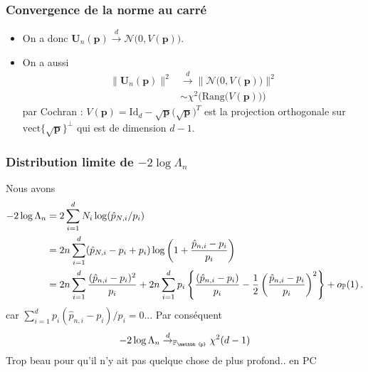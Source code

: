 \begin{frame}
\frametitle{Convergence de la norme au carré}
\begin{itemize}
\item On a donc ${\boldsymbol U}_n(\boldsymbol{p}) \stackrel{d}{\longrightarrow} {\mathcal N}\big(0,V(\boldsymbol{p})\big)$.
\item On a aussi
\begin{align*}
\|{\boldsymbol U}_n(\boldsymbol{p}) \|^2 & \stackrel{d}{\longrightarrow} \| {\mathcal N}\big(0,V(\boldsymbol{p})\big)\|^2 \\
& \sim \chi^2\big(\mathrm{Rang}\big(V(\boldsymbol{p})\big)\big)
\end{align*}
par \alert{Cochran} :  $V(\boldsymbol{p}) = \mathrm{Id}_d-\sqrt{\boldsymbol{p}}\big(\sqrt{\boldsymbol{p}}\big)^T$ est la projection orthogonale sur $\mathrm{vect}\{\sqrt{\boldsymbol{p}}\}^\perp$ qui est de dimension $d-1$.
\end{itemize}
\end{frame}


\begin{frame}
\frametitle{Distribution limite de $-2 \log \Lambda_n$}
Nous avons
\begin{align*}
-2 \log \Lambda_n &= 2\sum_{i=1}^d N_i \log( \hat{p}_{N,i}/p_i) \\
                  &= 2 n \sum_{i=1}^d  (\hat{p}_{N,i} - p_i + p_i) \log\left( 1 + \frac{\hat{p}_{n,i}-p_i}{p_i} \right) \\
                  &= 2 n \sum_{i=1}^d \frac{(\hat{p}_{n,i}-p_i)^2}{p_i} + 2 n \sum_{i=1}^d p_i \left\{ \frac{(\hat{p}_{n,i}-p_i)}{p_i} - \frac{1}{2} \left(\frac{\hat{p}_{n,i}-p_i}{p_i} \right)^2 \right\} + o_{\operatorname{{\mathbb P}}}(1) \,.
\end{align*}
car $\sum_{i=1}^d p_i (\hat{p}_{n,i} - p_i)/p_i= 0$... Par conséquent
\alert{
\[
-2 \log \Lambda_n \dlim_{\PP_{\mathbb{p}}} \chi^2(d-1)
\]
}
Trop beau pour qu'il n'y ait pas quelque chose de plus profond.. en PC
\end{frame}

